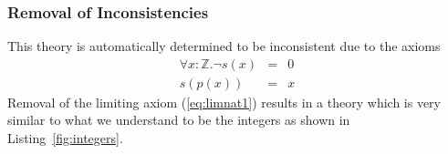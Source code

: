 \subsubsection{Removal of Inconsistencies}
This theory is automatically determined to be inconsistent due to the axioms
\begin{eqnarray}
\forall x : \mathbb{Z} . \neg s(x) &=& 0 \label{eq:limnat1}\\
s(p(x)) &=& x \label{eq:sucpre}
\end{eqnarray}
Removal of the limiting axiom (\ref{eq:limnat1}) results in a theory which is very
similar to what we understand to be the integers as shown in Listing~\ref{fig:integers}.
\begin{listing}[!ht]
\begin{mdframed}

\end{mdframed}
\end{listing}
